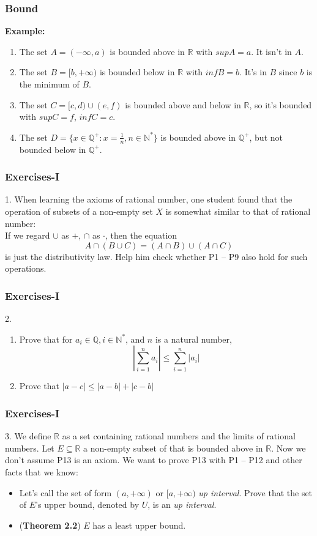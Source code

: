 \documentclass[12pt, t]{beamer}
\renewcommand{\emph}[1]{{\color{Turquoise3}\textsl{#1}}}
\begin{document}
\begin{frame}
    \frametitle{Bound}
\textbf{Example:}\\
\begin{enumerate}
    \item The set $A=(-\infty, a)$ is bounded above in $\mathbb{R}$ with $supA=a$. It isn't in $A$.
    \item The set $B=[b,+\infty)$ is bounded below in $\mathbb{R}$ with $infB=b$. It's in $B$ since $b$ is the minimum of $B$.
    \item The set $C=[c,d)\cup(e,f)$ is bounded above and below in $\mathbb{R}$, so it's bounded with $supC=f$, $infC=c$.
    \item The set $D=\{x\in \mathbb{Q}^+: x=\frac{1}{n}, n\in \mathbb{N}^*\}$ is bounded above in $\mathbb{Q}^+$, but not bounded 
        below in $\mathbb{Q}^+$.
\end{enumerate}
\end{frame}

\begin{frame}
    \frametitle{Exercises-I}
1. When learning the axioms of rational number, one student found that the operation of subsets of a non-empty 
set $X$ is somewhat similar to that of rational number:\\
\vspace{1em}
If we regard $\cup$ as $+$, $\cap$ as $\cdot$, then the equation 
\begin{equation*}
    A\cap(B\cup C)=(A\cap B)\cup(A\cap C)
\end{equation*}
is just the distributivity law. Help him  check whether P1 -- P9 also hold for such operations.
\end{frame}

\begin{frame}
    \frametitle{Exercises-I}
2.
\begin{enumerate}
    \item Prove that for $a_i\in \mathbb{Q}, i\in \mathbb{N^*}$, and $n$ is a natural number, 
        \begin{equation*}
            |\sum^n_{i=1}a_i|\leq\sum^n_{i=1}|a_i|
        \end{equation*}
    \item Prove that $|a-c|\leq |a-b| +|c-b|$
\end{enumerate}
\end{frame}

\begin{frame}
    \frametitle{Exercises-I}
3. We define $\mathbb{R}$ as a set containing rational numbers and the limits of rational numbers. 
Let $E\subseteq \mathbb{R}$ a non-empty subset of that is bounded above in $\mathbb{R}$. Now we don't 
assume P13 is an axiom. We want to prove P13 with P1 -- P12 and other facts that we know:
\begin{itemize}
    \item Let's call the set of form $(a,+\infty)$ or $[a,+\infty)$ \emph{up interval}. Prove that the 
        set of $E$'s upper bound, denoted by $U$, is an \emph{up interval}.
    \item (\textbf{Theorem 2.2}) $E$ has a least upper bound.
\end{itemize}
\end{frame}
\end{document}
